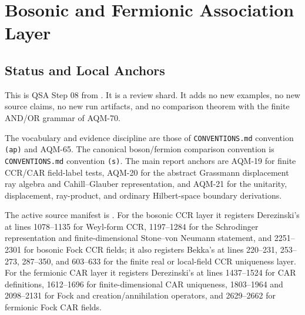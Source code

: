 
\section{Bosonic and Fermionic Association Layer}
\label{sec:qsa-boson-fermion-layer}

\subsection{Status and Local Anchors}

This is QSA Step 08 from
.  It is a review shard.  It
adds no new examples, no new source claims, no new run artifacts, and no
comparison theorem with the finite AND/OR grammar of AQM-70.

The vocabulary and evidence discipline are those of
\texttt{CONVENTIONS.md} convention \texttt{(ap)} and AQM-65.  The canonical
boson/fermion comparison convention is \texttt{CONVENTIONS.md} convention
\texttt{(s)}.  The main report anchors are
AQM-19 for finite CCR/CAR field-label tests, AQM-20 for the abstract
Grassmann displacement ray algebra and Cahill--Glauber representation, and
AQM-21 for the unitarity, displacement, ray-product, and ordinary
Hilbert-space boundary derivations.

The active source manifest is
.  For the bosonic CCR layer it
registers Derezinski's
at lines 1078--1135 for Weyl-form CCR, 1197--1284 for the Schrodinger
representation and finite-dimensional Stone--von Neumann statement, and
2251--2301 for bosonic Fock CCR fields; it also registers Bekka's
at lines 220--231, 253--273, 287--350, and 603--633 for the finite real or
local-field CCR uniqueness layer.  For the fermionic CAR layer it registers
Derezinski's
at lines 1437--1524 for CAR definitions,
1612--1696 for finite-dimensional CAR uniqueness, 1803--1964 and
2098--2131 for Fock and creation/annihilation operators, and 2629--2662 for
fermionic Fock CAR fields.

